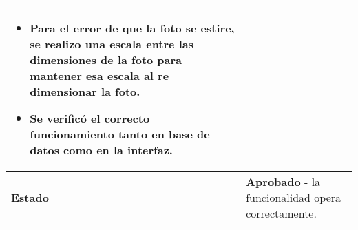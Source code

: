 \begin{longtable}{|p{5cm}|p{10cm}|}
\begin{itemize}
		\item Para el error de que la foto se estire, se realizo una escala entre las dimensiones de la foto para mantener esa escala al re dimensionar la foto.
		\item Se verificó el correcto funcionamiento tanto en base de datos como en la interfaz.
	\end{itemize} \\
	\hline
	\textbf{Estado} & 
	\textbf{Aprobado} - la funcionalidad opera correctamente. \\
	\hline
\end{longtable}